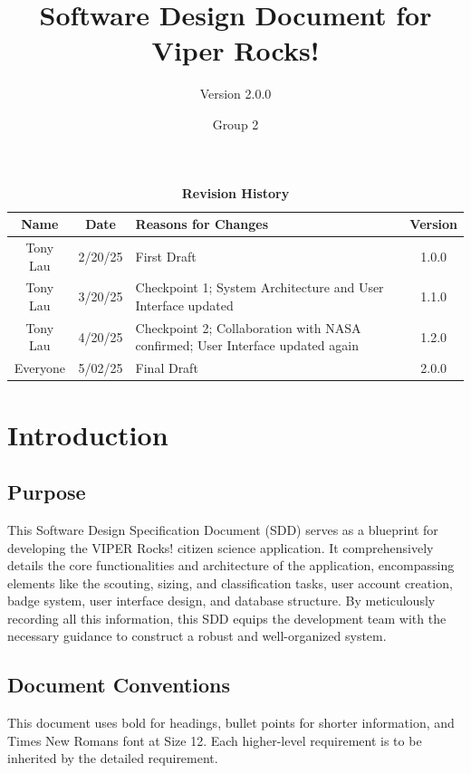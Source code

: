 \documentclass{article}
\begin{document}
\title{Software Design Document for Viper Rocks!}
\author{Version 2.0.0}
\date{Group 2}

\maketitle
\tableofcontents
\newpage

\fancyhf{}
\fancyfoot[C]{\thepage}

\begin{table}[h!]
\centering
\caption{\textbf{Revision History}}
\begin{tabularx}{\textwidth}{|c|c|X|c|}
\hline
\textbf{Name} & \textbf{Date} & \textbf{Reasons for Changes} & \textbf{Version} \\
\hline
Tony Lau & 2/20/25 & First Draft & 1.0.0 \\
\hline
Tony Lau & 3/20/25 & Checkpoint 1; System Architecture and User Interface updated & 1.1.0 \\
\hline
Tony Lau & 4/20/25 & Checkpoint 2; Collaboration with NASA confirmed; User Interface updated again & 1.2.0 \\
\hline
Everyone & 5/02/25 & Final Draft & 2.0.0 \\
\hline
\end{tabularx}
\end{table}

\section{Introduction}
\subsection{Purpose}
This Software Design Specification Document (SDD) serves as a blueprint for developing the VIPER Rocks! citizen science application. It comprehensively details the core functionalities and architecture of the application, encompassing elements like the scouting, sizing, and classification tasks, user account creation, badge system, user interface design, and database structure. By meticulously recording all this information, this SDD equips the development team with the necessary guidance to construct a robust and well-organized system.

\subsection{Document Conventions}
This document uses bold for headings, bullet points for shorter information, and Times New Romans font at Size 12. Each higher-level requirement is to be inherited by the detailed requirement.
\end{document}
